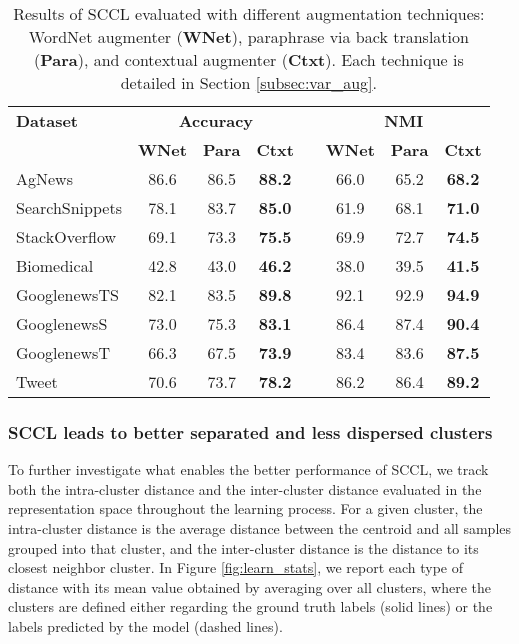 \documentclass[11pt]{article}
\begin{document}
\begin{table*}[!htbp]
  \begin{center}
    \begin{tabular}{lccccccc}
    \textbf{Dataset}  &\multicolumn{3}{c}{\textbf{Accuracy}}& &\multicolumn{3}{c}{\textbf{NMI}} \\
    \cline{2-4} \cline{6-8} 
    &\textbf{WNet}  &\textbf{Para}
    &\textbf{Ctxt}& &\textbf{WNet}  &\textbf{Para}
    &\textbf{Ctxt}\\
    
    AgNews& 86.6 &        86.5 &        \textbf{88.2} &       &      66.0 &      65.2 &      \textbf{68.2} \\
    SearchSnippets& 78.1 &        83.7 &        \textbf{85.0} &       &      61.9 &      68.1 &      \textbf{71.0} \\
    StackOverflow& 69.1 &        73.3 &        \textbf{75.5} &       &      69.9 &      72.7 &      \textbf{74.5} \\
    Biomedical& 42.8 &        43.0 &        \textbf{46.2} &       &      38.0 &      39.5 &      \textbf{41.5} \\
    GooglenewsTS& 82.1 &        83.5 &        \textbf{89.8} &       &      92.1 &      92.9 &      \textbf{94.9} \\
    GooglenewsS& 73.0 &        75.3 &        \textbf{83.1} &       &      86.4 &      87.4 &      \textbf{90.4} \\
    GooglenewsT& 66.3 &        67.5 &        \textbf{73.9} &       &      83.4 &      83.6 &      \textbf{87.5} \\
    Tweet& 70.6 &        73.7 &        \textbf{78.2} &       &      86.2 &      86.4 &      \textbf{89.2} \\
    \end{tabular}
    \caption{Results of SCCL evaluated with different augmentation techniques: WordNet augmenter (\textbf{WNet}), paraphrase via back translation (\textbf{Para}), and contextual augmenter (\textbf{Ctxt}).
     Each technique is detailed in Section \ref{subsec:var_aug}.}
     \label{tab:varaug}
  \end{center}
\end{table*}



\subsubsection{SCCL leads to better separated and less dispersed clusters} 
To further investigate what enables the better performance of SCCL,  we track both the intra-cluster distance and the inter-cluster distance evaluated in the representation space throughout the learning process. For a given cluster, the intra-cluster distance is the average distance between the centroid and all samples grouped into that cluster, and the inter-cluster distance is the distance to its closest neighbor cluster. In Figure \ref{fig:learn_stats}, we report each type of distance with its mean value obtained by averaging over all clusters, where the clusters are defined either regarding the ground truth labels (solid lines) or the labels predicted by the model (dashed lines). 
\end{document}
